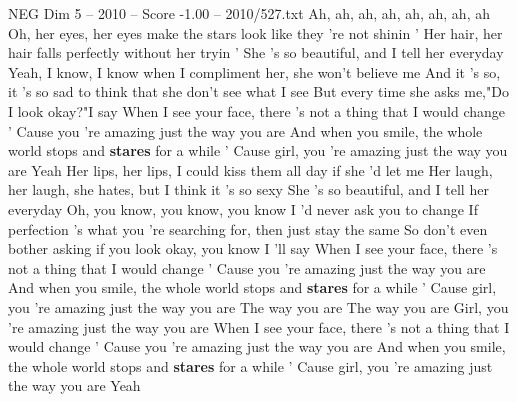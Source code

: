 \begin{textsample}{NEG Dim 5 – 2010 – Score -1.00 – 2010/527.txt}  \label{ex:f5_neg_014}
Ah, ah, ah, ah, ah, ah, ah, ah Oh, her eyes, her eyes make the stars look like they 're not shinin ' Her hair, her hair falls perfectly without her tryin ' She 's so beautiful, and I tell her everyday Yeah, I know, I know when I compliment her, she won't believe me And it 's so, it 's so sad to think that she don't see what I see But every time she asks me,"Do I look okay?"I say When I see your face, there 's not a thing that I would change ' Cause you 're amazing just the way you are And when you smile, the whole world stops and \textbf{stares} for a while ' Cause girl, you 're amazing just the way you are Yeah Her lips, her lips, I could kiss them all day if she 'd let me Her laugh, her laugh, she hates, but I think it 's so sexy She 's so beautiful, and I tell her everyday Oh, you know, you know, you know I 'd never ask you to change If perfection 's what you 're searching for, then just stay the same So don't even bother asking if you look okay, you know I 'll say When I see your face, there 's not a thing that I would change ' Cause you 're amazing just the way you are And when you smile, the whole world stops and \textbf{stares} for a while ' Cause girl, you 're amazing just the way you are The way you are The way you are Girl, you 're amazing just the way you are When I see your face, there 's not a thing that I would change ' Cause you 're amazing just the way you are And when you smile, the whole world stops and \textbf{stares} for a while ' Cause girl, you 're amazing just the way you are Yeah

\end{textsample}
